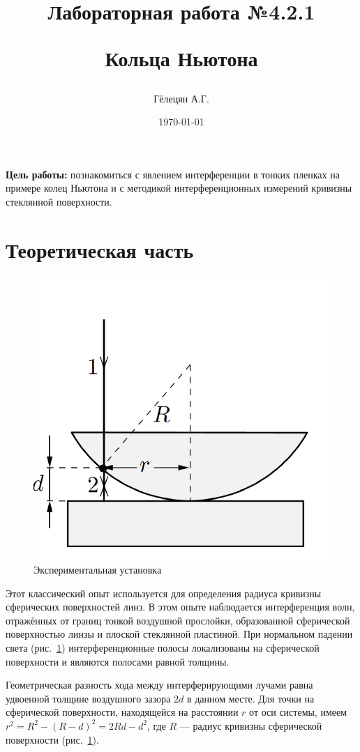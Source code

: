 \documentclass{article}
\title{\begin{center}Лабораторная работа №4.2.1\end{center}
Кольца Ньютона}
\author{Гёлецян А.Г.}
\date{\today}
\begin{document}
\maketitle
\newpage
{}

\textbf{Цель работы:} познакомиться с явлением интерференции в тонких пленках
на примере колец Ньютона и с методикой интерференционных измерений кривизны
стеклянной поверхности.

\section{Теоретическая часть}
\begin{figure} 
    \includegraphics[width=\linewidth]{lens.png}
    \caption{Экспериментальная установка}\label{fig:lens}
\end{figure}

Этот классический опыт используется для определения радиуса кривизны сферических
поверхностей линз. В этом опыте наблюдается интерференция волн, отражённых от границ
тонкой воздушной прослойки, образованной сферической поверхностью линзы и плоской
стеклянной пластиной. При нормальном падении света (рис.~\ref{fig:lens})
интерференционные полосы локализованы на сферической поверхности и являются
полосами равной толщины.
	
Геометрическая разность хода между интерферирующими лучами равна удвоенной толщине
воздушного зазора $ 2d $ в данном месте. Для точки на сферической поверхности,
находящейся на расстоянии $ r $ от оси системы, имеем
$ r^2 = R^2 - {(R - d)}^2 = 2Rd - d^2 $, где $ R $ --- радиус кривизны сферической
поверхности (рис.~\ref{fig:lens}).
	
\end{document}
